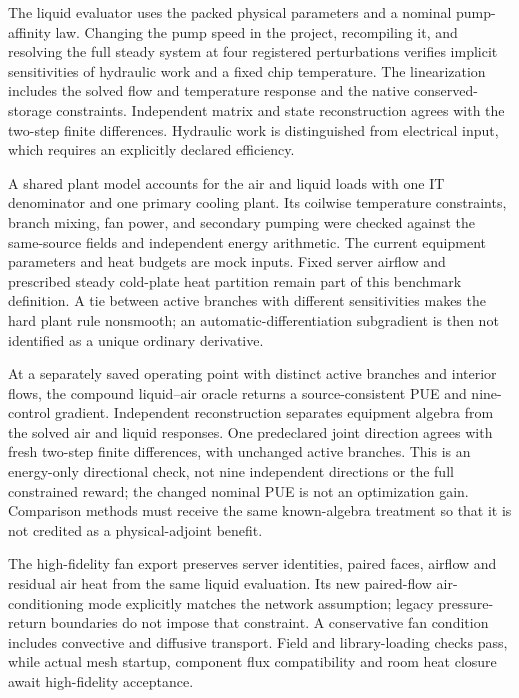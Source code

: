 The liquid evaluator uses the packed physical parameters and a nominal pump-affinity law. Changing the pump speed in the project, recompiling it, and resolving the full steady system at four registered perturbations verifies implicit sensitivities of hydraulic work and a fixed chip temperature. The linearization includes the solved flow and temperature response and the native conserved-storage constraints. Independent matrix and state reconstruction agrees with the two-step finite differences. Hydraulic work is distinguished from electrical input, which requires an explicitly declared efficiency.

A shared plant model accounts for the air and liquid loads with one IT denominator and one primary cooling plant. Its coilwise temperature constraints, branch mixing, fan power, and secondary pumping were checked against the same-source fields and independent energy arithmetic. The current equipment parameters and heat budgets are mock inputs. Fixed server airflow and prescribed steady cold-plate heat partition remain part of this benchmark definition. A tie between active branches with different sensitivities makes the hard plant rule nonsmooth; an automatic-differentiation subgradient is then not identified as a unique ordinary derivative.

At a separately saved operating point with distinct active branches and interior flows, the compound liquid--air oracle returns a source-consistent PUE and nine-control gradient. Independent reconstruction separates equipment algebra from the solved air and liquid responses. One predeclared joint direction agrees with fresh two-step finite differences, with unchanged active branches. This is an energy-only directional check, not nine independent directions or the full constrained reward; the changed nominal PUE is not an optimization gain. Comparison methods must receive the same known-algebra treatment so that it is not credited as a physical-adjoint benefit.

The high-fidelity fan export preserves server identities, paired faces, airflow and residual air heat from the same liquid evaluation. Its new paired-flow air-conditioning mode explicitly matches the network assumption; legacy pressure-return boundaries do not impose that constraint. A conservative fan condition includes convective and diffusive transport. Field and library-loading checks pass, while actual mesh startup, component flux compatibility and room heat closure await high-fidelity acceptance.

